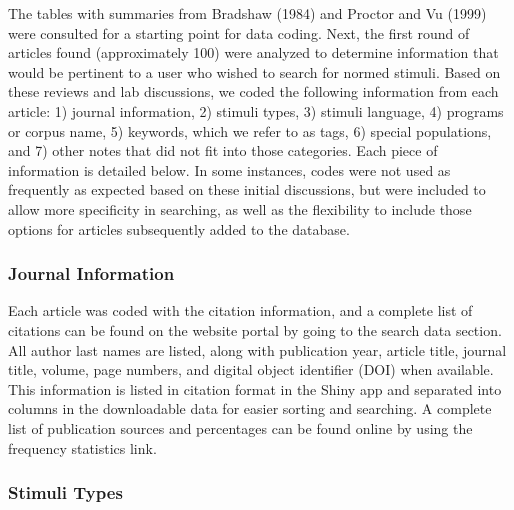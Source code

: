 \documentclass[english,,man]{apa6}
\theoremstyle{definition}
\theoremstyle{definition}
\theoremstyle{definition}
\theoremstyle{remark}
\begin{document}
The tables with summaries from Bradshaw (1984) and Proctor and Vu (1999)
were consulted for a starting point for data coding. Next, the first
round of articles found (approximately 100) were analyzed to determine
information that would be pertinent to a user who wished to search for
normed stimuli. Based on these reviews and lab discussions, we coded the
following information from each article: 1) journal information, 2)
stimuli types, 3) stimuli language, 4) programs or corpus name, 5)
keywords, which we refer to as tags, 6) special populations, and 7)
other notes that did not fit into those categories. Each piece of
information is detailed below. In some instances, codes were not used as
frequently as expected based on these initial discussions, but were
included to allow more specificity in searching, as well as the
flexibility to include those options for articles subsequently added to
the database.

\hypertarget{journal-information}{%
\subsubsection{Journal Information}\label{journal-information}}

Each article was coded with the citation information, and a complete
list of citations can be found on the website portal by going to the
search data section. All author last names are listed, along with
publication year, article title, journal title, volume, page numbers,
and digital object identifier (DOI) when available. This information is
listed in citation format in the Shiny app and separated into columns in
the downloadable data for easier sorting and searching. A complete list
of publication sources and percentages can be found online by using the
frequency statistics link.

\hypertarget{stimuli-types}{%
\subsubsection{Stimuli Types}\label{stimuli-types}}
\end{document}
